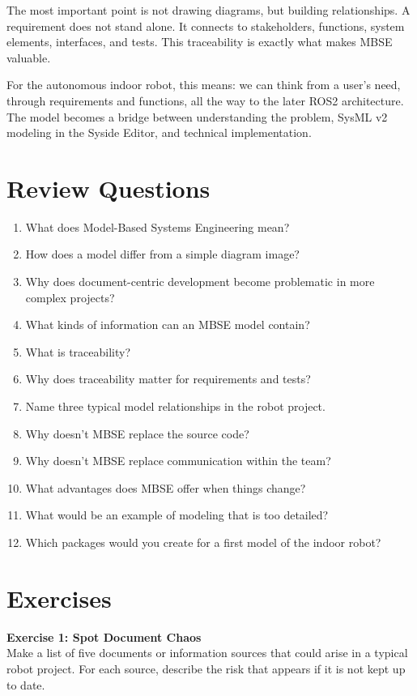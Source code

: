 The most important point is not drawing diagrams, but building relationships. A requirement does not stand alone. It connects to stakeholders, functions, system elements, interfaces, and tests. This traceability is exactly what makes MBSE valuable.

For the autonomous indoor robot, this means: we can think from a user's need, through requirements and functions, all the way to the later ROS2 architecture. The model becomes a bridge between understanding the problem, SysML v2 modeling in the Syside Editor, and technical implementation.

\section{Review Questions}
\begin{enumerate}
    \item What does Model-Based Systems Engineering mean?
    \item How does a model differ from a simple diagram image?
    \item Why does document-centric development become problematic in more complex projects?
    \item What kinds of information can an MBSE model contain?
    \item What is traceability?
    \item Why does traceability matter for requirements and tests?
    \item Name three typical model relationships in the robot project.
    \item Why doesn't MBSE replace the source code?
    \item Why doesn't MBSE replace communication within the team?
    \item What advantages does MBSE offer when things change?
    \item What would be an example of modeling that is too detailed?
    \item Which packages would you create for a first model of the indoor robot?
\end{enumerate}

\section{Exercises}
\begin{uebungbox}
\textbf{Exercise 1: Spot Document Chaos}\\
Make a list of five documents or information sources that could arise in a typical robot project. For each source, describe the risk that appears if it is not kept up to date.
\end{uebungbox}

